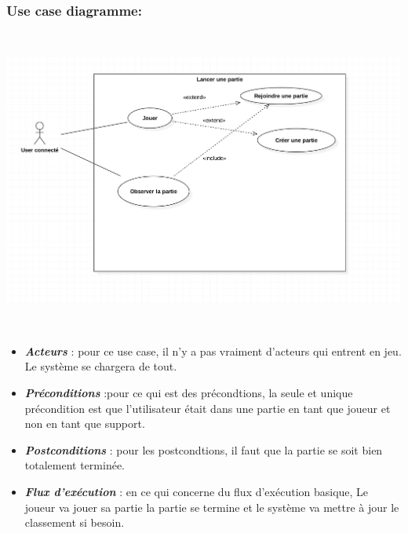 \documentclass[10pt,a4paper]{article}
\begin{document}
\subsubsection{Use case diagramme:}	
\begin{center}
    \includegraphics[height=10cm,width=15cm]{lancer_une_partie.png}
\end{center}
\newpage
\begin{itemize}
\item \textit{\textbf{Acteurs}} : pour ce use case, il n'y a pas vraiment d'acteurs qui entrent en jeu. Le système se chargera de tout.\\

\item \textit{\textbf{Préconditions}} :pour ce qui est des précondtions, la seule et unique précondition est que l'utilisateur était dans une partie en tant que joueur et non en tant que support.\\

\item \textit{\textbf{Postconditions}} : pour les postcondtions, il faut que la partie se soit bien totalement terminée.\\

\item \textit{\textbf{Flux d'exécution}} : en ce qui concerne du flux d'exécution basique, Le joueur va jouer sa partie la partie se termine et le système va mettre à jour le classement si besoin.\\
\end{itemize}
\end{document}
